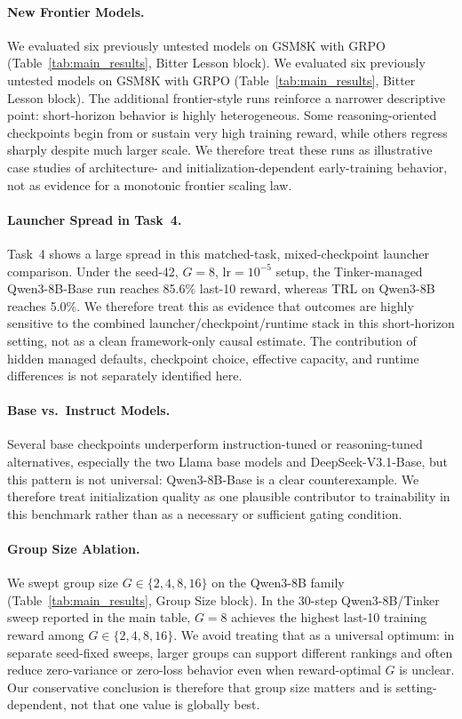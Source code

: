 \documentclass{article}
\begin{document}
\paragraph{New Frontier Models.}
We evaluated six previously untested models on GSM8K with GRPO (Table~\ref{tab:main_results}, Bitter Lesson block).
We evaluated six previously untested models on GSM8K with GRPO
(Table~\ref{tab:main_results}, Bitter Lesson block). The additional
frontier-style runs reinforce a narrower descriptive point: short-horizon
behavior is highly heterogeneous. Some reasoning-oriented checkpoints begin
from or sustain very high training reward, while others regress sharply despite
much larger scale. We therefore treat these runs as illustrative case studies
of architecture- and initialization-dependent early-training behavior, not as
evidence for a monotonic frontier scaling law.

\paragraph{Launcher Spread in Task~4.}
Task~4 shows a large spread in this matched-task, mixed-checkpoint launcher
comparison. Under the seed-42, $G=8$, lr$=10^{-5}$ setup, the Tinker-managed
Qwen3-8B-Base run reaches 85.6\% last-10 reward, whereas TRL on Qwen3-8B
reaches 5.0\%. We therefore treat this as evidence that outcomes are highly
sensitive to the combined launcher/checkpoint/runtime stack in this
short-horizon setting, not as a clean framework-only causal estimate. The
contribution of hidden managed defaults, checkpoint choice, effective
capacity, and runtime differences is not separately identified here.

\paragraph{Base vs.~Instruct Models.}
Several base checkpoints underperform instruction-tuned or reasoning-tuned
alternatives, especially the two Llama base models and DeepSeek-V3.1-Base, but
this pattern is not universal: Qwen3-8B-Base is a clear counterexample. We
therefore treat initialization quality as one plausible contributor to
trainability in this benchmark rather than as a necessary or sufficient gating
condition.

\paragraph{Group Size Ablation.}
We swept group size $G \in \{2, 4, 8, 16\}$ on the Qwen3-8B family
(Table~\ref{tab:main_results}, Group Size block).
In the 30-step Qwen3-8B/Tinker sweep reported in the main table, $G{=}8$
achieves the highest last-10 training reward among $G \in \{2,4,8,16\}$. We
avoid treating that as a universal optimum: in separate seed-fixed sweeps,
larger groups can support different
rankings and often reduce
zero-variance or zero-loss behavior even when reward-optimal $G$ is unclear.
Our conservative conclusion is therefore that group size matters and is
setting-dependent, not that one value is globally best.
\end{document}

